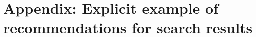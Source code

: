 \documentclass[a4paper,debug,notitlepage,nobib]{tufte-book}
\begin{document}
\chapter{Appendix: Explicit example of recommendations for search results}
\label{app:ExampleRec_Appendix}


%
% 
%
%
%
%
%
\printbibliography
\end{document}
